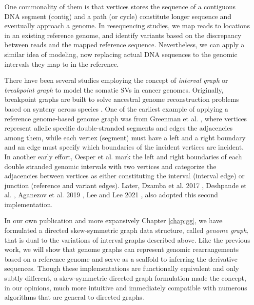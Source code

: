 \documentclass[phd,tocprelim]{cornell}
\begin{document}
One commonality of them is that vertices stores the sequence of a contiguous DNA segment (contig) and a path (or cycle) constitute longer sequence and eventually approach a genome. In resequencing studies, we map reads to locations in an existing reference genome, and identify variants based on the discrepancy between reads and the mapped reference sequence. Nevertheless, we can apply a similar idea of modeling, now replacing actual DNA sequences to the genomic intervals they map to in the reference.

\clearpage
There have been several studies employing the concept of \textit{interval graph} or \textit{breakpoint graph} to model the somatic SVs in cancer genomes. Originally, breakpoint graphs are built to solve ancestral genome reconstruction problems based on synteny across species \cite{Alekseyev2009-fw,Avdeyev2016-un}. One of the earliest example of applying a reference genome-based genome graph was from Greenman et al. \cite{Greenman:2012eg}, where vertices represent allelic specific double-stranded segments and edges the adjacencies among them, while each vertex (segment) must have a left and a right boundary and an edge must specify which boundaries of the incident vertices are incident. In another early effort, Oesper et al. \cite{Oesper2012-vw} mark the left and right boundaries of each double stranded genomic intervals with two vertices and categorize the adjacencies between vertices as either constituting the interval (interval edge) or junction (reference and variant edges). Later, Dzamba et al. 2017 \cite{Dzamba2017-wo}, Deshpande et al. \cite{Deshpande2019-gs}, Aganezov et al. 2019 \cite{Aganezov2019-yh}, Lee and Lee 2021 \cite{Lee2021-rl}, also adopted this second implementation.
 
In our own publication \cite{Hadi2020-um} and more expansively Chapter \ref{chap:gg}, we have formulated a directed skew-symmetric graph data structure, called \textit{genome graph}, that is dual to the variations of interval graphs described above. Like the previous work, we will show that genome graphs can represent genomic rearrangements based on a reference genome and serve as a scaffold to inferring the derivative sequences. Though these implementations are functionally equivalent and only subtly different, a skew-symmetric directed graph formulation made the concept, in our opinions, much more intuitive and immediately compatible with numerous algorithms that are general to directed graphs.
\end{document}
